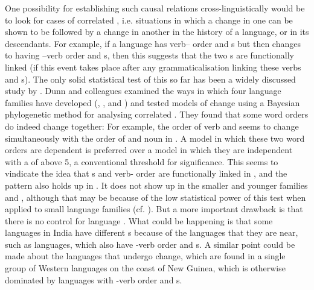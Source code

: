 \documentclass[output=paper]{langsci/langscibook}
\begin{document}
One possibility for establishing such causal relations cross-linguistically would be to look for cases of correlated , i.e. situations in which a change in one  can be shown to be followed by a change in another  in the history of a language, or in its descendants. For example, if a language has verb– order and s but then changes to having –verb order and s, then this suggests that the two s are functionally linked (if this event takes place after any grammaticalisation linking these verbs and s). The only solid statistical test of this so far has been a widely discussed study by \citet{DunnEtAl2011}. Dunn and colleagues examined the ways in which four language families have developed (, ,  and ) and tested models of  change using a Bayesian phylogenetic method for analysing correlated . They found that some word orders do indeed change together: For example, the order of verb and  seems to change simultaneously with the order of  and noun in . A model in which these two word orders are dependent is preferred over a model in which they are independent with a  of above 5, a conventional threshold for significance. This seems to vindicate the idea that s and verb- order are functionally linked in , and the pattern also holds up in . It does not show up in the smaller and younger families  and , although that may be because of the low statistical power of this test when applied to small language families (cf. \citealt{CroftEtAl2011}). But a more important drawback is that there is no control for language . What could be happening is that some  languages in India have different s because of the languages that they are near, such as  languages, which also have -verb order and s.  A similar point could be made about the  languages that undergo  change, which are found in a single group of Western  languages on the coast of New Guinea, which is otherwise dominated by languages with -verb order and s.
\end{document}
